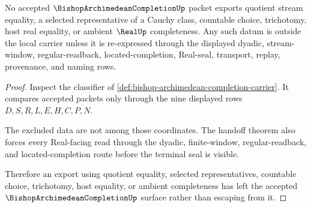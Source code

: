 \begin{theorem}
\label{thm:bishop-archimedean-completion-no-quotient-nonescape}
No accepted $\BishopArchimedeanCompletionUp$ packet exports quotient stream equality, a selected representative of a Cauchy class, countable choice, trichotomy, host real equality, or ambient $\RealUp$ completeness. Any such datum is outside the local carrier unless it is re-expressed through the displayed dyadic, stream-window, regular-readback, located-completion, Real-seal, transport, replay, provenance, and naming rows.
\end{theorem}
\begin{proof}
Inspect the classifier of \autoref{def:bishop-archimedean-completion-carrier}. It compares accepted packets only through the nine displayed rows $D,S,R,L,E,H,C,P,N$.

The excluded data are not among those coordinates. The handoff theorem also forces every Real-facing read through the dyadic, finite-window, regular-readback, and located-completion route before the terminal seal is visible.

Therefore an export using quotient equality, selected representatives, countable choice, trichotomy, host equality, or ambient completeness has left the accepted $\BishopArchimedeanCompletionUp$ surface rather than escaping from it.
\end{proof}




